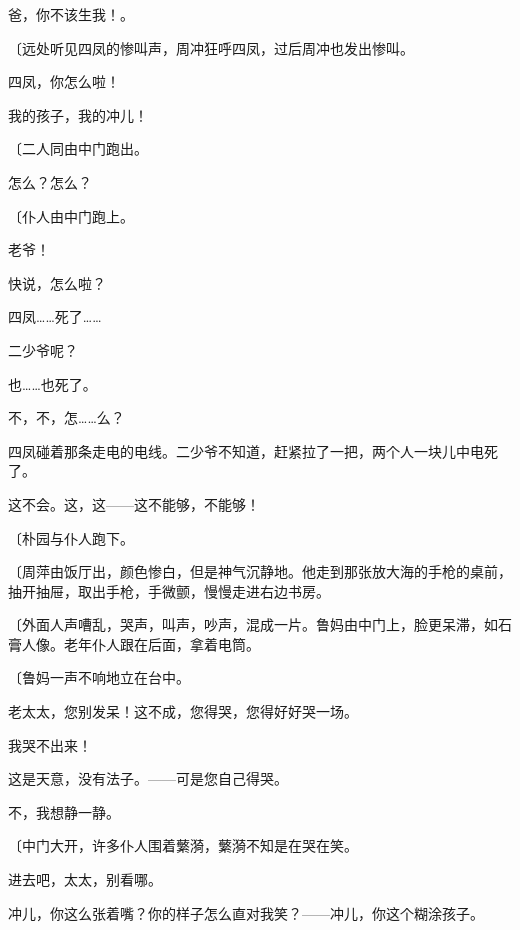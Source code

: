 爸，你不该生我！。

{\fangsong〔远处听见四凤的惨叫声，周冲狂呼四凤，过后周冲也发出惨叫。}

四凤，你怎么啦！


我的孩子，我的冲儿！

{\fangsong〔二人同由中门跑出。}

怎么？怎么？

{\fangsong〔仆人由中门跑上。}

老爷！

快说，怎么啦？

四凤……死了……

二少爷呢？

也……也死了。

不，不，怎……么？

四凤碰着那条走电的电线。二少爷不知道，赶紧拉了一把，两个人一块儿中电死了。

这不会。这，这——这不能够，不能够！

{\fangsong〔朴园与仆人跑下。}

{\fangsong〔周萍由饭厅出，颜色惨白，但是神气沉静地。他走到那张放大海的手枪的桌前，抽开抽屉，取出手枪，手微颤，慢慢走进右边书房。}

{\fangsong〔外面人声嘈乱，哭声，叫声，吵声，混成一片。鲁妈由中门上，脸更呆滞，如石膏人像。老年仆人跟在后面，拿着电筒。}

{\fangsong〔鲁妈一声不响地立在台中。}

老太太，您别发呆！这不成，您得哭，您得好好哭一场。

我哭不出来！

这是天意，没有法子。——可是您自己得哭。

不，我想静一静。

{\fangsong〔中门大开，许多仆人围着蘩漪，蘩漪不知是在哭在笑。}

进去吧，太太，别看哪。

冲儿，你这么张着嘴？你的样子怎么直对我笑？——冲儿，你这个糊涂孩子。

